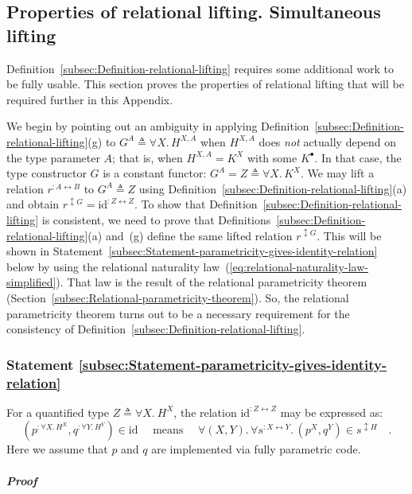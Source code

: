 \subsection{Properties of relational lifting. Simultaneous lifting}

Definition~\ref{subsec:Definition-relational-lifting} requires some
additional work to be fully usable. This section proves the properties
of relational lifting that will be required further in this Appendix.

We begin by pointing out an ambiguity in applying Definition~\ref{subsec:Definition-relational-lifting}(g)
to $G^{A}\triangleq\forall X.\,H^{X,A}$ when $H^{X,A}$ does \emph{not}
actually depend on the type parameter $A$; that is, when $H^{X,A}=K^{X}$
with some $K^{\bullet}$. In that case, the type constructor $G$
is a constant functor: $G^{A}=Z\triangleq\forall X.\,K^{X}$. We may
lift a relation $r^{:A\leftrightarrow B}$ to $G^{A}\triangleq Z$
using Definition~\ref{subsec:Definition-relational-lifting}(a) and
obtain $r^{\updownarrow G}=\text{id}^{:Z\leftrightarrow Z}$. To show
that Definition~\ref{subsec:Definition-relational-lifting} is consistent,
we need to prove that Definitions~\ref{subsec:Definition-relational-lifting}(a)
and~(g) define the same lifted relation $r^{\updownarrow G}$. This
will be shown in Statement~\ref{subsec:Statement-parametricity-gives-identity-relation}
below by using the relational naturality law~(\ref{eq:relational-naturality-law-simplified}).
That law is the result of the relational parametricity theorem (Section~\ref{subsec:Relational-parametricity-theorem}).
So, the relational parametricity theorem turns out to be a necessary
requirement for the consistency of Definition~\ref{subsec:Definition-relational-lifting}.

\subsubsection{Statement \label{subsec:Statement-parametricity-gives-identity-relation}\ref{subsec:Statement-parametricity-gives-identity-relation}}

For a quantified type $Z\triangleq\forall X.\ H^{X}$, the relation
$\text{id}^{:Z\leftrightarrow Z}$ may be expressed as:
\[
(p^{:\forall X.\,H^{X}},q^{:\forall Y.\,H^{Y}})\in\text{id}\quad\text{ means }\quad\forall(X,Y).\,\forall s^{:X\leftrightarrow Y}.\,(p^{X},q^{Y})\in s^{\updownarrow H}\quad.
\]
Here we assume that $p$ and $q$ are implemented via fully parametric
code.

\subparagraph{Proof}

